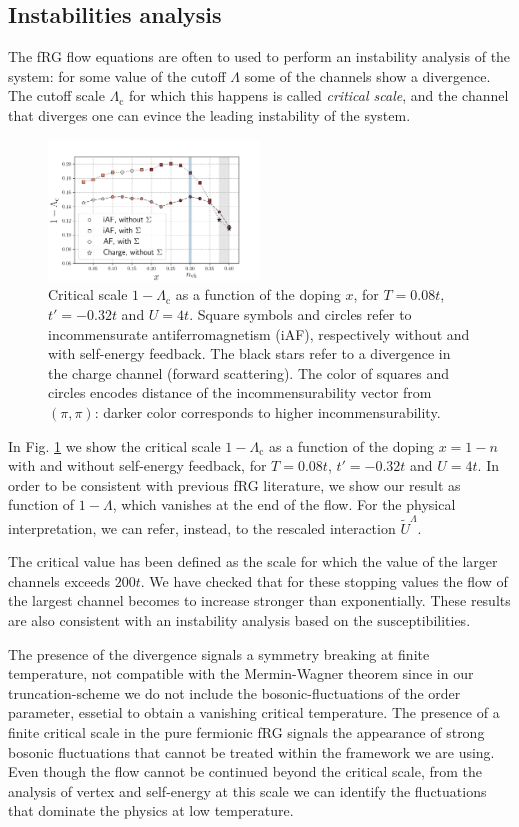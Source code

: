 \subsection{Instabilities analysis}
The fRG flow equations are often to used to perform an instability analysis of the system: 
for some value of the cutoff $\Lambda$ some of the channels show a divergence. 
The cutoff scale $\Lambda_{\mathrm{c}} $ for which this happens is called \textit{critical scale}, and the channel that diverges one can evince the leading instability of the system. 
\begin{figure}
\includegraphics[width=0.5\textwidth]{images/phasediag.png}
\caption{Critical scale $1-\Lambda_{\mathrm{c}}$ as a function of the doping $x$, for $T = 0.08t$, $t'=-0.32t$ and $U=4t$. 
Square symbols and circles refer to incommensurate antiferromagnetism (iAF), respectively without and with self-energy feedback.
The black stars refer to a divergence in the charge channel (forward scattering). 
The color of squares and circles encodes distance of the incommensurability vector from $(\pi,\pi)$: darker color corresponds to higher incommensurability. }  
\label{fig:criscale} 
\end{figure}
In Fig. \ref{fig:criscale} we show the critical scale $1-\Lambda_{\mathrm{c}}$ as a function of the doping $x=1-n$ with and without self-energy feedback,  for $T=0.08t$, $t'=-0.32t$ and  $U=4t$.
In order to be consistent with previous fRG literature, we show our result as function of $1-\Lambda$, which vanishes at the end of the flow. 
For the physical interpretation, we can refer, instead, to the rescaled interaction $\tilde U ^\Lambda$.  


The critical value has been defined as the scale for which the value of  the larger channels exceeds $200t$. 
We have checked that for these stopping values the flow of the largest channel becomes to increase stronger than exponentially. These results are also consistent with an instability analysis based on the susceptibilities.        

The presence of the divergence signals a symmetry breaking at finite temperature, not compatible with the Mermin-Wagner theorem\cite{Mermin1966} since in our truncation-scheme we do not include the bosonic-fluctuations of the order parameter\cite{Baier2004}, essetial to obtain a vanishing critical temperature. 
The presence of a finite critical scale in the pure fermionic fRG signals the appearance of strong bosonic fluctuations that cannot be treated within the framework we are using. 
Even though the flow cannot be continued beyond the critical scale, from the analysis of vertex and self-energy at this scale we can identify the fluctuations that dominate the physics at low temperature.

